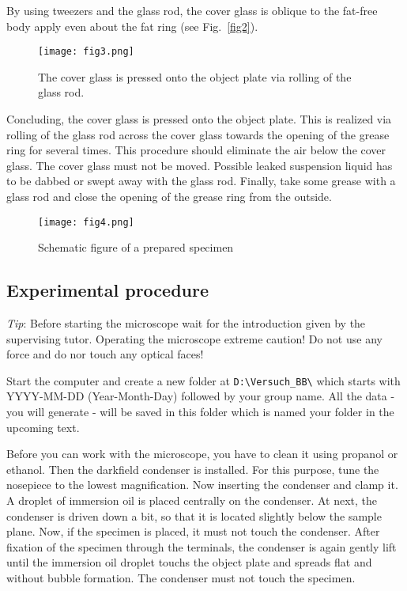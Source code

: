 \documentclass{tudphygp_eng}
\begin{document}
By using tweezers and the glass rod, the cover glass is oblique to the fat-free body apply even about the fat ring (see Fig.~\ref{fig2}). 

\begin{figure}[t]
\begin{center}
\texttt{[image: fig3.png]} 
\caption{The cover glass is pressed onto the object plate via rolling of the glass rod.}
\label{fig3}
\end{center}
\end{figure}

Concluding, the cover glass is pressed onto the object plate. This is realized via rolling of the glass rod across the cover glass towards the opening of the grease ring for several times. This procedure should eliminate the air below the cover glass. The cover glass must not be moved. Possible leaked suspension liquid has to be dabbed or swept away with the glass rod. Finally, take some grease with a glass rod and close the opening of the grease ring from the outside.

\begin{figure}[h]
\begin{center}
\texttt{[image: fig4.png]} 
\caption{Schematic figure of a prepared specimen}
\label{fig4}
\end{center}
\end{figure}

\subsection{Experimental procedure}

\emph{Tip}: Before starting the microscope wait for the introduction given by the supervising tutor. Operating the microscope extreme caution! Do not use any force and do nor touch any optical faces!

Start the computer and create a new folder at \verb|D:\Versuch_BB\| which starts with YYYY-MM-DD (Year-Month-Day) followed by your group name. All the data - you will generate - will be saved in this folder which is named \grqq{}your folder\grqq{} in the upcoming text.

Before you can work with the microscope, you have to clean it using  propanol or ethanol. Then the darkfield condenser is installed. For this purpose, tune the nosepiece to the lowest magnification. Now inserting the condenser and clamp it. A droplet of immersion oil is placed centrally on the condenser. At next, the condenser is driven down a bit, so that it is located slightly below the sample plane. Now, if the specimen is placed, it must not touch the condenser. After fixation of the specimen through the terminals, the condenser is again gently lift until the immersion oil droplet touchs the object plate and spreads flat and without bubble formation. The condenser must not touch the specimen.
\end{document}
